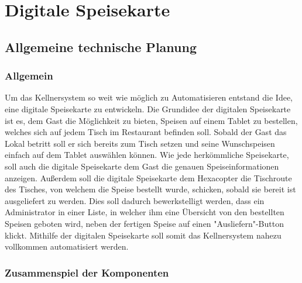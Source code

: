 \chapter{Digitale Speisekarte}
\renewcommand{\kapitelautor}{Autor: Katharina Joksch}

\section{Allgemeine technische Planung}
  \subsection{Allgemein}
  
Um das Kellnersystem so weit wie möglich zu Automatisieren entstand die Idee, eine digitale Speisekarte zu entwickeln. 
Die Grundidee der digitalen Speisekarte ist es, dem Gast die Möglichkeit zu bieten, Speisen auf einem Tablet zu bestellen, welches sich auf jedem Tisch im Restaurant befinden soll.
Sobald der Gast das Lokal betritt soll er sich bereits zum Tisch setzen und seine Wunschspeisen einfach auf dem Tablet auswählen können.
Wie jede herkömmliche Speisekarte, soll auch die digitale Speisekarte dem Gast die genauen Speiseinformationen anzeigen.
Außerdem soll die digitale Speisekarte dem Hexacopter die Tischroute des Tisches, von welchem die Speise bestellt wurde, schicken, sobald sie bereit ist ausgeliefert zu werden. 
Dies soll dadurch bewerkstelligt werden, dass ein Administrator in einer Liste, in welcher ihm eine Übersicht von den bestellten Speisen geboten wird, neben der fertigen Speise auf einen "Ausliefern"-Button klickt.
Mithilfe der digitalen Speisekarte soll somit das Kellnersystem nahezu vollkommen automatisiert werden.
  
  \subsection{Zusammenspiel der Komponenten}

